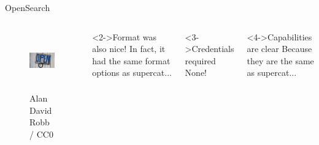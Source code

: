 \documentclass{beamer}
\begin{document}
\begin{frame}{OpenSearch}

\begin{columns}

 \begin{figure}
  \begin{center}
   \includegraphics[height=1in]{opensearch.jpg}
   \caption{Alan David Robb / CC0}
  \end{center}

 \end{figure}


\begin{block}<2->{Format was also nice!}
In fact, it had the same format options as supercat...
\end{block}
\begin{block}<3->{Credentials required}
None!
\end{block}
\begin{block}<4->{Capabilities are clear}
Because they are the same as supercat...
\end{block}
\end{columns}


 
\end{frame}
\end{document}
